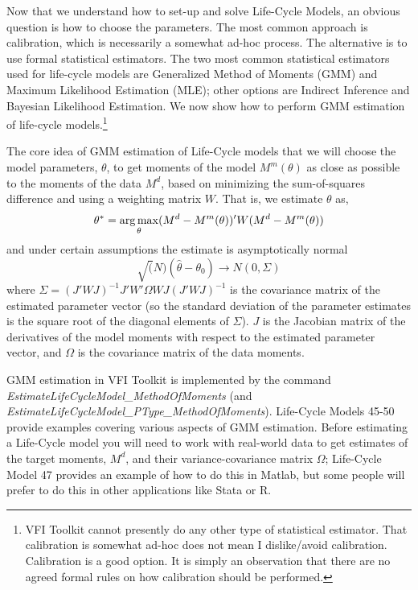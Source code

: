 Now that we understand how to set-up and solve Life-Cycle Models, an obvious question is how to choose the parameters. The most common approach is calibration, which is necessarily a somewhat ad-hoc process. The alternative is to use formal statistical estimators. The two most common statistical estimators used for life-cycle models are Generalized Method of Moments (GMM) and Maximum Likelihood Estimation (MLE); other options are Indirect Inference and Bayesian Likelihood Estimation. We now show how to perform GMM estimation of life-cycle models.\footnote{VFI Toolkit cannot presently do any other type of statistical estimator. That calibration is somewhat ad-hoc does not mean I dislike/avoid calibration. Calibration is a good option. It is simply an observation that there are no agreed formal rules on how calibration should be performed.}

The core idea of GMM estimation of Life-Cycle models that we will choose the model parameters, $\theta$, to get moments of the model $M^m(\theta)$ as close as possible to the moments of the data $M^d$, based on minimizing the sum-of-squares difference and using a weighting matrix $W$. That is, we estimate $\theta$ as,
\begin{equation*}
 \theta^*= \operatorname*{arg\,max}_{\theta} (M^d-M^m(\theta))' W (M^d-M^m(\theta))
\end{equation*}
and under certain assumptions the estimate is asymptotically normal
\begin{equation*}
 \sqrt(N) (\hat{\theta}-\theta_0) \to N(0,\Sigma)
\end{equation*}
where $\Sigma=(J'WJ)^{-1} J'W'\Omega W J (J'WJ)^{-1}$ is the covariance matrix of the estimated parameter vector (so the standard deviation of the parameter estimates is the square root of the diagonal elements of $\Sigma$). $J$ is the Jacobian matrix of the derivatives of the model moments with respect to the estimated parameter vector, and $\Omega$ is the covariance matrix of the data moments.

GMM estimation in VFI Toolkit is implemented by the command \textit{EstimateLifeCycleModel\_{}MethodOfMoments} (and \textit{EstimateLifeCycleModel\_{}PType\_{}MethodOfMoments}). Life-Cycle Models 45-50 provide examples covering various aspects of GMM estimation. Before estimating a Life-Cycle model you will need to work with real-world data to get estimates of the target moments, $M^d$, and their variance-covariance matrix $\Omega$; Life-Cycle Model 47 provides an example of how to do this in Matlab, but some people will prefer to do this in other applications like Stata or R.

